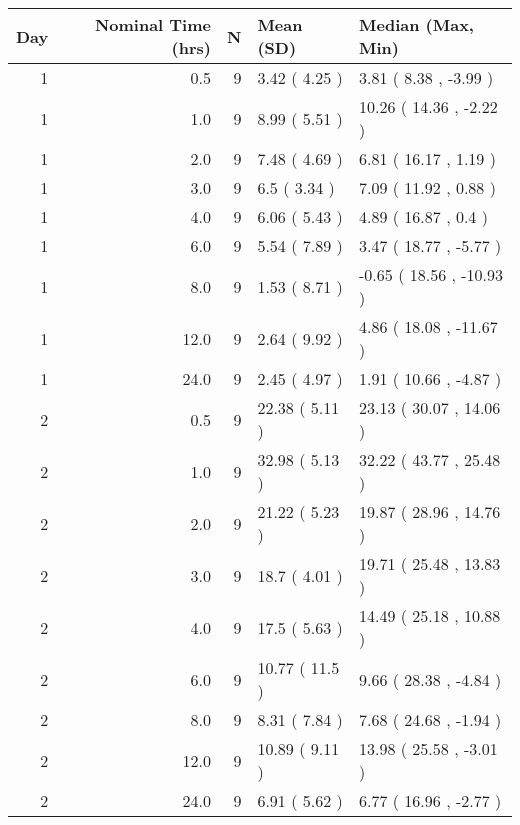 
\begin{tabular}{rrrll}
\toprule
Day & Nominal Time (hrs) & N & Mean (SD) & Median (Max, Min)\\
\midrule
1 & 0.5 & 9 & 3.42 ( 4.25 ) & 3.81 ( 8.38 , -3.99 )\\
1 & 1.0 & 9 & 8.99 ( 5.51 ) & 10.26 ( 14.36 , -2.22 )\\
1 & 2.0 & 9 & 7.48 ( 4.69 ) & 6.81 ( 16.17 , 1.19 )\\
1 & 3.0 & 9 & 6.5 ( 3.34 ) & 7.09 ( 11.92 , 0.88 )\\
1 & 4.0 & 9 & 6.06 ( 5.43 ) & 4.89 ( 16.87 , 0.4 )\\
1 & 6.0 & 9 & 5.54 ( 7.89 ) & 3.47 ( 18.77 , -5.77 )\\
1 & 8.0 & 9 & 1.53 ( 8.71 ) & -0.65 ( 18.56 , -10.93 )\\
1 & 12.0 & 9 & 2.64 ( 9.92 ) & 4.86 ( 18.08 , -11.67 )\\
1 & 24.0 & 9 & 2.45 ( 4.97 ) & 1.91 ( 10.66 , -4.87 )\\
2 & 0.5 & 9 & 22.38 ( 5.11 ) & 23.13 ( 30.07 , 14.06 )\\
2 & 1.0 & 9 & 32.98 ( 5.13 ) & 32.22 ( 43.77 , 25.48 )\\
2 & 2.0 & 9 & 21.22 ( 5.23 ) & 19.87 ( 28.96 , 14.76 )\\
2 & 3.0 & 9 & 18.7 ( 4.01 ) & 19.71 ( 25.48 , 13.83 )\\
2 & 4.0 & 9 & 17.5 ( 5.63 ) & 14.49 ( 25.18 , 10.88 )\\
2 & 6.0 & 9 & 10.77 ( 11.5 ) & 9.66 ( 28.38 , -4.84 )\\
2 & 8.0 & 9 & 8.31 ( 7.84 ) & 7.68 ( 24.68 , -1.94 )\\
2 & 12.0 & 9 & 10.89 ( 9.11 ) & 13.98 ( 25.58 , -3.01 )\\
2 & 24.0 & 9 & 6.91 ( 5.62 ) & 6.77 ( 16.96 , -2.77 )\\
\bottomrule
\end{tabular}
